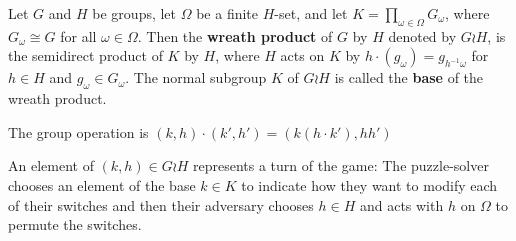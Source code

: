 \begin{definition}
  Let $G$ and $H$ be groups,
  let $\Omega$ be a finite $H$-set, and
  let $K = \prod_{\omega \in \Omega} G_\omega$, where $G_\omega \cong G$
  for all $\omega \in \Omega$.
  Then the \textbf{wreath product} of $G$ by $H$ denoted by $G \wr H$,
  is the semidirect product of $K$ by $H$,
  where $H$ acts on $K$ by $h \cdot (g_\omega) = g_{h^{-1}\omega}$ for $h \in H$
  and $g_\omega \in G_\omega$.
  The normal subgroup $K$ of $G \wr H$ is called
  the \textbf{base} of the wreath product.

  The group operation is $(k, h) \cdot (k', h') = (k(h \cdot k'), hh')$
\end{definition}

An element of $(k, h) \in G \wr H$ represents a turn of the game:
The puzzle-solver chooses an element of the base $k \in K$ to indicate
how they want to modify each of their switches
and then their adversary chooses $h \in H$ and acts with $h$ on $\Omega$ to
permute the switches.

